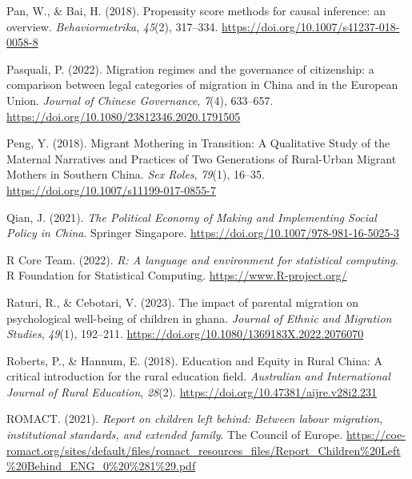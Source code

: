 \documentclass[
  man]{apa7}
\newlength{\cslhangindent}
\newlength{\cslentryspacingunit} %
\newenvironment{CSLReferences}[2] %
 {%
  \setlength{\parindent}{0pt}
  \ifodd #1
  \let\oldpar\par
  \def\par{\hangindent=\cslhangindent\oldpar}
  \fi
  \setlength{\parskip}{#2\cslentryspacingunit}
 }%
 {}
\begin{document}
\begin{CSLReferences}{1}{0}
\leavevmode{}%
Pan, W., \& Bai, H. (2018). Propensity score methods for causal inference: an overview. \emph{Behaviormetrika}, \emph{45}(2), 317--334. \url{https://doi.org/10.1007/s41237-018-0058-8}

\leavevmode{}%
Pasquali, P. (2022). Migration regimes and the governance of citizenship: a comparison between legal categories of migration in {China} and in the European Union. \emph{Journal of Chinese Governance}, \emph{7}(4), 633--657. \url{https://doi.org/10.1080/23812346.2020.1791505}

\leavevmode{}%
Peng, Y. (2018). Migrant Mothering in Transition: A Qualitative Study of the Maternal Narratives and Practices of Two Generations of Rural-Urban Migrant Mothers in Southern {China}. \emph{Sex Roles}, \emph{79}(1), 16--35. \url{https://doi.org/10.1007/s11199-017-0855-7}

\leavevmode{}%
Qian, J. (2021). \emph{The Political Economy of Making and Implementing Social Policy in {China}}. Springer Singapore. \url{https://doi.org/10.1007/978-981-16-5025-3}

\leavevmode{}%
R Core Team. (2022). \emph{R: A language and environment for statistical computing}. R Foundation for Statistical Computing. \url{https://www.R-project.org/}

\leavevmode{}%
Raturi, R., \& Cebotari, V. (2023). The impact of parental migration on psychological well-being of children in ghana. \emph{Journal of Ethnic and Migration Studies}, \emph{49}(1), 192--211. \url{https://doi.org/10.1080/1369183X.2022.2076070}

\leavevmode{}%
Roberts, P., \& Hannum, E. (2018). Education and Equity in Rural {China}: A critical introduction for the rural education field. \emph{Australian and International Journal of Rural Education}, \emph{28}(2). \url{https://doi.org/10.47381/aijre.v28i2.231}

\leavevmode{}%
ROMACT. (2021). \emph{Report on children left behind: Between labour migration, institutional standards, and extended family}. The Council of Europe. \url{https://coe-romact.org/sites/default/files/romact_resources_files/Report_Children\%20Left\%20Behind_ENG_0\%20\%281\%29.pdf}


\end{CSLReferences}
\end{document}
